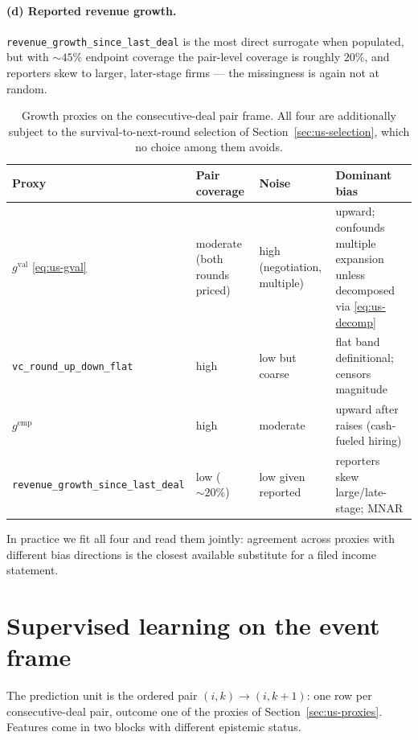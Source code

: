 \paragraph{(d) Reported revenue growth.}
\texttt{revenue\_growth\_since\_last\_deal} is the most direct surrogate when populated,
but with $\sim\!45\%$ endpoint coverage the pair-level coverage is roughly $20\%$, and
reporters skew to larger, later-stage firms --- the missingness is again not at random.

\begin{table}[htbp]
\centering
\small
\begin{tabular}{p{3.1cm}p{2.1cm}p{2.5cm}p{4.2cm}}
\toprule
Proxy & Pair coverage & Noise & Dominant bias \\
\midrule
$g^{\mathrm{val}}$ \eqref{eq:us-gval} & moderate (both rounds priced) & high (negotiation,
multiple) & upward; confounds multiple expansion unless decomposed via
\eqref{eq:us-decomp} \\
\texttt{vc\_round\_}\newline\texttt{up\_down\_flat} & high & low but coarse & flat band
definitional; censors magnitude \\
$g^{\mathrm{emp}}$ & high & moderate & upward after raises (cash-fueled hiring) \\
\texttt{revenue\_growth\_}\newline\texttt{since\_last\_deal} & low ($\sim\!20\%$) & low
given reported & reporters skew large/late-stage; MNAR \\
\bottomrule
\end{tabular}
\caption{Growth proxies on the consecutive-deal pair frame. All four are additionally
subject to the survival-to-next-round selection of Section~\ref{sec:us-selection}, which
no choice among them avoids.}
\label{tab:us-proxies}
\end{table}

In practice we fit all four and read them jointly: agreement across proxies with different
bias directions is the closest available substitute for a filed income statement.

\section{Supervised learning on the event frame}
\label{sec:us-event}

The prediction unit is the ordered pair $(i,k) \to (i,k+1)$: one row per consecutive-deal
pair, outcome one of the proxies of Section~\ref{sec:us-proxies}. Features come in two
blocks with different epistemic status.

